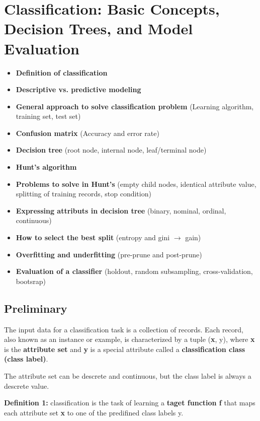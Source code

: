 \chapter{Classification: Basic Concepts, Decision Trees, and Model Evaluation}
	
	\begin{itemize}
		\item {\bf Definition of classification}
		\item {\bf Descriptive vs. predictive modeling}
		\item {\bf General approach to solve classification problem} (Learning algorithm, training set, test set)
		\item {\bf Confusion matrix} (Accuracy and error rate)
		\item {\bf Decision tree} (root node, internal node, leaf/terminal node)
		\item {\bf Hunt's algorithm}
		\item {\bf Problems to solve in Hunt's} (empty child nodes, identical attribute value, splitting of 
		training records, stop condition)
		\item {\bf Expressing attributs in decision tree} (binary, nominal, ordinal, continuous)
		\item {\bf How to select the best split} (entropy and gini $\rightarrow$ gain)
		\item {\bf Overfitting and underfitting} (pre-prune and post-prune)
		\item {\bf Evaluation of a classifier} (holdout, random subsampling, cross-validation, bootsrap)
	\end{itemize}
	

	\clearpage

	\section{Preliminary}

		The input data for a classification task is a collection of records.
		Each record, also known as an instance or example, is characterized
		by a tuple ({\bf x}, y), where {\bf x} is the {\bf attribute set} and
		{\bf y} is a special attribute called a {\bf classification class (class label)}.

		The attribute set can be descrete and continuous, but the class label
		is always a descrete value. 

		{\bf Definition 1:} classification is the task of
		learning a {\bf taget function f} that maps each attribute set {\bf x}
		to one of the predifined class labels y.

